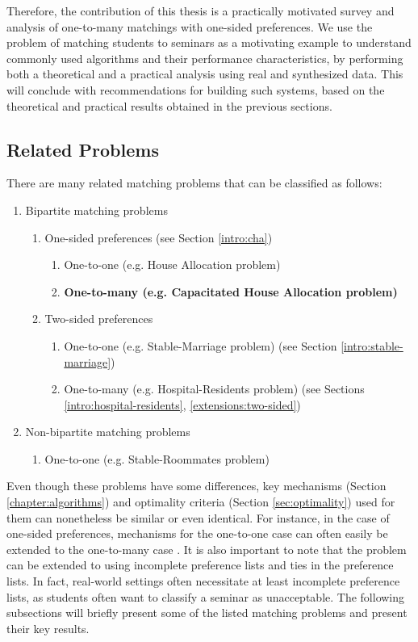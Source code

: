 Therefore, the contribution of this thesis is a practically motivated survey and analysis of one-to-many matchings with one-sided preferences. We use the problem of matching students to seminars as a motivating example to understand commonly used algorithms and their performance characteristics, by performing both a theoretical and a practical analysis using real and synthesized data. This will conclude with recommendations for building such systems, based on the theoretical and practical results obtained in the previous sections. 

\subsection{Related Problems}
There are many related matching problems that can be classified as follows:
\begin{enumerate}
    \item Bipartite matching problems
    \begin{enumerate}
        \item One-sided preferences (see Section \ref{intro:cha})
        \begin{enumerate}
            \item One-to-one (e.g. House Allocation problem)
            \item \textbf{One-to-many (e.g. Capacitated House Allocation problem)} 
        \end{enumerate}
        \item Two-sided preferences
        \begin{enumerate}
            \item One-to-one (e.g. Stable-Marriage problem) (see Section \ref{intro:stable-marriage})
            \item One-to-many (e.g. Hospital-Residents problem) (see Sections \ref{intro:hospital-residents}, \ref{extensions:two-sided})
        \end{enumerate}
    \end{enumerate}
    \item Non-bipartite matching problems 
    \begin{enumerate}
        \item One-to-one (e.g. Stable-Roommates problem)
    \end{enumerate}
\end{enumerate}
Even though these problems have some differences, key mechanisms (Section \ref{chapter:algorithms}) and optimality criteria (Section \ref{sec:optimality}) used for them can nonetheless be similar or even identical. For instance, in the case of one-sided preferences, mechanisms for the one-to-one case can often easily be extended to the one-to-many case \cite{Gusfield}. It is also important to note that the problem can be extended to using incomplete preference lists and ties in the preference lists. In fact, real-world settings often necessitate at least incomplete preference lists, as students often want to classify a seminar as unacceptable. The following subsections will briefly present some of the listed matching problems and present their key results.  


